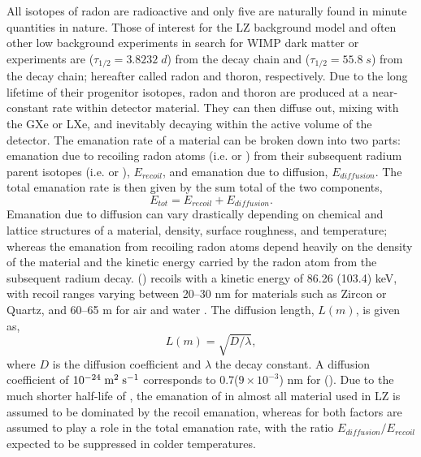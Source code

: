 All isotopes of radon are radioactive and only five are naturally found in minute quantities in nature. Those of interest for the LZ background model and often other low background experiments in search for WIMP dark matter or \neutrinolessDoubleBeta{} experiments are \RnTTT{} ($\tau_{1/2}=3.8232 \; d$) from the \UTTE{} decay chain and \RnTTZ{} ($\tau_{1/2}=55.8 \; s$) from the \ThTTT{} decay chain; hereafter called radon and thoron, respectively. Due to the long lifetime of their progenitor isotopes, radon and thoron are produced at a near-constant rate within detector material. They can then diffuse out, mixing with the GXe or LXe, and inevitably decaying within the active volume of the detector. The emanation rate of a material can be broken down into two parts: emanation due to recoiling radon atoms (i.e. \RnTTT{} or \RnTTZ{}) from their subsequent radium parent isotopes (i.e. \RaTTS{} or \RaTTF{}), $E_{recoil}$, and emanation due to diffusion, $E_{diffusion}$. The total emanation rate is then given by the sum total of the two components,
%
\begin{equation}
    E_{tot} = E_{recoil} + E_{diffusion}.
    \label{eq:radon_emanation}
\end{equation}
%
Emanation due to diffusion can vary drastically depending on chemical and lattice structures of a material, density, surface roughness, and temperature; whereas the emanation from recoiling radon atoms depend heavily on the density of the material and the kinetic energy carried by the radon atom from the subsequent radium decay. \RnTTT{} (\RnTTZ{}) recoils with a kinetic energy of 86.26 (103.4) keV, with recoil ranges varying between 20--30 nm for materials such as Zircon or Quartz, and 60--65 \micro{}m for air and water \cite{radon_emanation_modeling}. The diffusion length, $L(m)$, is given as, 
%
\begin{equation}
    L(m) = \sqrt{D/\lambda},
    \label{eq:radon_emanation_diffusion}
\end{equation}
%
where $D$ is the diffusion coefficient and $\lambda{}$ the decay constant. A diffusion coefficient of $10^{-24} \; \text{m}^2 \; \text{s}^{-1}$ corresponds to 0.7($9 \times{} 10^{-3}$) nm for \RnTTT{} (\RnTTZ{}). Due to the much shorter half-life of \RnTTZ{}, the emanation of \RnTTZ{} in almost all material used in LZ is assumed to be dominated by the recoil emanation, whereas for \RnTTT{} both factors are assumed to play a role in the total emanation rate, with the ratio $E_{diffusion}/E_{recoil}$ expected to be suppressed in colder temperatures. 


